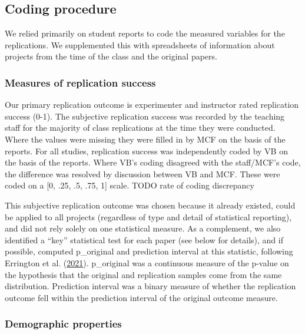 \documentclass[
  english,
  a4paper,
]{article}
\begin{document}
\hypertarget{coding-procedure}{%
\subsection{Coding procedure}\label{coding-procedure}}

We relied primarily on student reports to code the measured variables for the replications. We supplemented this with spreadsheets of information about projects from the time of the class and the original papers.

\hypertarget{measures-of-replication-success}{%
\subsubsection{Measures of replication success}\label{measures-of-replication-success}}

Our primary replication outcome is experimenter and instructor rated replication success (0-1). The subjective replication success was recorded by the teaching staff for the majority of class replications at the time they were conducted. Where the values were missing they were filled in by MCF on the basis of the reports. For all studies, replication success was independently coded by VB on the basis of the reports. Where VB's coding disagreed with the staff/MCF's code, the difference was resolved by discussion between VB and MCF. These were coded on a {[}0, .25, .5, .75, 1{]} scale. TODO rate of coding discrepancy

This subjective replication outcome was chosen because it already existed, could be applied to all projects (regardless of type and detail of statistical reporting), and did not rely solely on one statistical measure. As a complement, we also identified a ``key'' statistical test for each paper (see below for details), and if possible, computed p\_original and prediction interval at this statistic, following Errington et al. (\protect\hyperlink{ref-errington2021}{2021}). p\_original was a continuous measure of the p-value on the hypothesis that the original and replication samples come from the same distribution. Prediction interval was a binary measure of whether the replication outcome fell within the prediction interval of the original outcome measure.

\hypertarget{demographic-properties}{%
\subsubsection{Demographic properties}\label{demographic-properties}}
\end{document}
